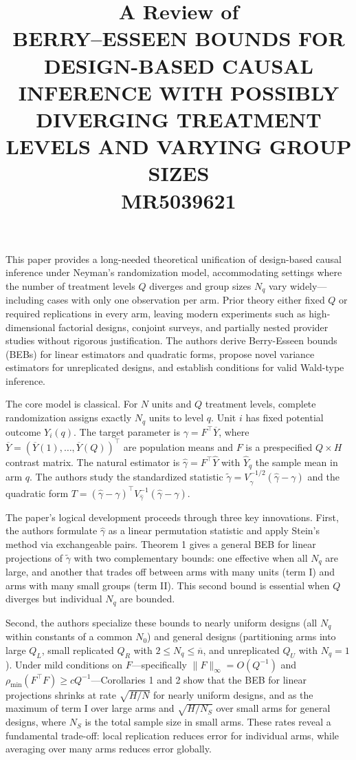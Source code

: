 \documentclass[11pt]{article}
\title{A Review of \\BERRY–ESSEEN BOUNDS FOR DESIGN-BASED CAUSAL INFERENCE
	WITH POSSIBLY DIVERGING TREATMENT LEVELS AND VARYING
	GROUP SIZES\\MR5039621}
\begin{document}
	\maketitle	

\noindent 
This paper provides a long-needed theoretical unification of design-based causal inference under Neyman's randomization model, accommodating settings where the number of treatment levels $Q$ diverges and group sizes $N_q$ vary widely---including cases with only one observation per arm. Prior theory either fixed $Q$ or required replications in every arm, leaving modern experiments such as high-dimensional factorial designs, conjoint surveys, and partially nested provider studies without rigorous justification. The authors derive Berry-Esseen bounds (BEBs) for linear estimators and quadratic forms, propose novel variance estimators for unreplicated designs, and establish conditions for valid Wald-type inference.

The core model is classical. For $N$ units and $Q$ treatment levels, complete randomization assigns exactly $N_q$ units to level $q$. Unit $i$ has fixed potential outcome $Y_i(q)$. The target parameter is $\gamma = F^\top \overline{Y}$, where $\overline{Y}=(\overline{Y}(1),\dots,\overline{Y}(Q))^\top$ are population means and $F$ is a prespecified $Q\times H$ contrast matrix. The natural estimator is $\widehat{\gamma}=F^\top\widehat{Y}$ with $\widehat{Y}_q$ the sample mean in arm $q$. The authors study the standardized statistic $\widetilde{\gamma}=V_{\widehat{\gamma}}^{-1/2}(\widehat{\gamma}-\gamma)$ and the quadratic form $T=(\widehat{\gamma}-\gamma)^\top V_{\widehat{\gamma}}^{-1}(\widehat{\gamma}-\gamma)$.

The paper's logical development proceeds through three key innovations. First, the authors formulate $\widehat{\gamma}$ as a linear permutation statistic and apply Stein's method via exchangeable pairs. Theorem 1 gives a general BEB for linear projections of $\widetilde{\gamma}$ with two complementary bounds: one effective when all $N_q$ are large, and another that trades off between arms with many units (term I) and arms with many small groups (term II). This second bound is essential when $Q$ diverges but individual $N_q$ are bounded.

Second, the authors specialize these bounds to nearly uniform designs (all $N_q$ within constants of a common $N_0$) and general designs (partitioning arms into large $Q_L$, small replicated $Q_R$ with $2\le N_q\le \overline{n}$, and unreplicated $Q_U$ with $N_q=1$). Under mild conditions on $F$---specifically $\|F\|_\infty = O(Q^{-1})$ and $\rho_{\min}(F^\top F)\ge c Q^{-1}$---Corollaries 1 and 2 show that the BEB for linear projections shrinks at rate $\sqrt{H/N}$ for nearly uniform designs, and as the maximum of term I over large arms and $\sqrt{H/N_S}$ over small arms for general designs, where $N_S$ is the total sample size in small arms. These rates reveal a fundamental trade-off: local replication reduces error for individual arms, while averaging over many arms reduces error globally.
\end{document}
